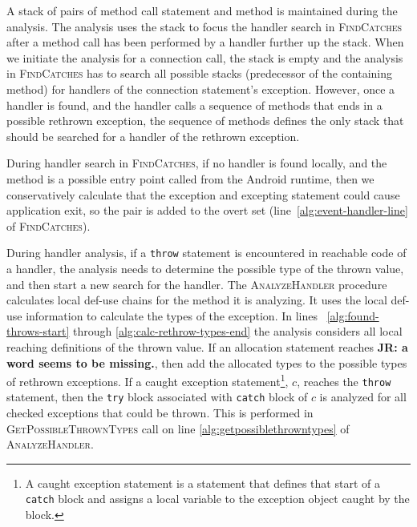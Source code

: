 A stack of pairs of method call statement and method is maintained
during the analysis.  The analysis uses the stack to focus the handler
search in \textsc{FindCatches} after a method call has been performed
by a handler further up the stack. When we initiate the analysis for
a connection call, the stack is empty and the analysis in
\textsc{FindCatches} has to search all possible stacks (predecessor of
the containing method) for handlers of the connection statement's
exception.  However, once a handler is found, and the handler calls a
sequence of methods that ends in a possible rethrown exception, the
sequence of methods defines the only stack that should be searched for
a handler of the rethrown exception.  


During handler search in \textsc{FindCatches}, if no handler is found
locally, and the method is a possible entry point called from the
Android runtime, then we conservatively calculate that the exception
and excepting statement could cause application exit, so the pair is
added to the overt set (line~\ref{alg:event-handler-line} of
\textsc{FindCatches}). 

During handler analysis, if a \lstinline!throw! statement is
encountered in reachable code of a handler, the analysis needs to
determine the possible type of the thrown value, and then start a new
search for the handler.  The \textsc{AnalyzeHandler} procedure
calculates local def-use chains for the method it is analyzing.  It
uses the local def-use information to calculate the types of the
exception.  In lines ~\ref{alg:found-throws-start} through
\ref{alg:calc-rethrow-types-end} the analysis considers all local
reaching definitions of the thrown value.  If an allocation statement
reaches {\bf JR: a word seems to be missing.}, then add the allocated types to the possible types of
rethrown exceptions. If a caught exception statement\footnote{A caught
  exception statement is a statement that defines that start of a
  \lstinline!catch! block and assigns a local variable to the
  exception object caught by the block.}, $c$, reaches the
\lstinline!throw! statement, then the \lstinline!try! block associated
with \lstinline!catch! block of $c$ is analyzed for all checked
exceptions that could be thrown.  This is performed in
\textsc{GetPossibleThrownTypes} call on line
\ref{alg:getpossiblethrowntypes} of \textsc{AnalyzeHandler}.

